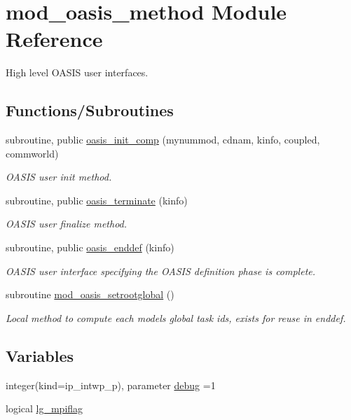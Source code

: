 \hypertarget{namespacemod__oasis__method}{}\section{mod\+\_\+oasis\+\_\+method Module Reference}
\label{namespacemod__oasis__method}


High level O\+A\+S\+IS user interfaces.  


\subsection*{Functions/\+Subroutines}
\begin{DoxyCompactItemize}
\item 
subroutine, public \hyperlink{namespacemod__oasis__method_ad266b77f6e75f2d150c80374a841a43c}{oasis\+\_\+init\+\_\+comp} (mynummod, cdnam, kinfo, coupled, commworld)
\begin{DoxyCompactList}\small\item\em O\+A\+S\+IS user init method. \end{DoxyCompactList}\item 
subroutine, public \hyperlink{namespacemod__oasis__method_a4fb881336906c9452b6a9f250af9c3d7}{oasis\+\_\+terminate} (kinfo)
\begin{DoxyCompactList}\small\item\em O\+A\+S\+IS user finalize method. \end{DoxyCompactList}\item 
subroutine, public \hyperlink{namespacemod__oasis__method_a093552f9f9895ac79a5fefa043fc5881}{oasis\+\_\+enddef} (kinfo)
\begin{DoxyCompactList}\small\item\em O\+A\+S\+IS user interface specifying the O\+A\+S\+IS definition phase is complete. \end{DoxyCompactList}\item 
subroutine \hyperlink{namespacemod__oasis__method_a13d6e469ea14642a2e1e6cb807d9b7de}{mod\+\_\+oasis\+\_\+setrootglobal} ()
\begin{DoxyCompactList}\small\item\em Local method to compute each models\textquotesingle{} global task ids, exists for reuse in enddef. \end{DoxyCompactList}\end{DoxyCompactItemize}
\subsection*{Variables}
\begin{DoxyCompactItemize}
\item 
integer(kind=ip\+\_\+intwp\+\_\+p), parameter \hyperlink{namespacemod__oasis__method_a390290b92b6af57b2732cb7521532f1c}{debug} =1
\item 
logical \hyperlink{namespacemod__oasis__method_a405af91a0535e4ce70d55513bb4c3867}{lg\+\_\+mpiflag}
\end{DoxyCompactItemize}


